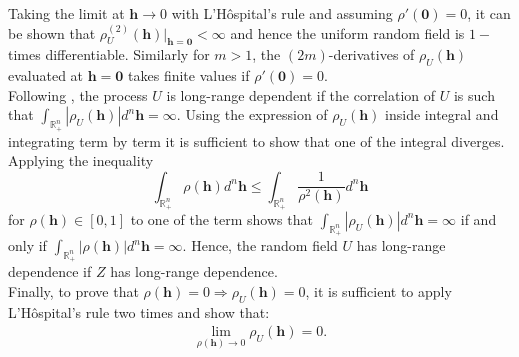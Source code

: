 \documentclass[times,sort&compress,3p]{elsarticle}
\theoremstyle{plain}%
\theoremstyle{definition}
\def\hh{\bm{h}}
\begin{document}
Taking the limit at $\hh\rightarrow 0$ with  L'H\^{o}spital's rule   and assuming $\rho'(\bm{0})=0$, it can be shown that $\rho_{U}^{(2)}(\hh)\big\vert_{\hh\bm{=0}}<\infty$ and hence the uniform random field is $1-$times differentiable. Similarly for  $m> 1$,  the $(2m)$-derivatives of $\rho_{U}(\hh)$  evaluated at $\hh=\bm{0}$
 takes finite values if $\rho'(\bm{0})=0$.
\\
Following \cite{LiTe09}, the process $U$ is long-range dependent if the correlation of $U$ is such that $\int_{\mathbb{R}_{+}^{n}}|\rho_{U}(\hh)|d^{n}\hh=\infty$.
Using the expression of $\rho_{U}(\hh)$ inside integral and integrating term by term it is sufficient to show that one of the integral diverges.
Applying the inequality  $$\int_{\mathbb{R}_{+}^{n}}\rho(\hh)d^{n}\hh \leq  \int_{\mathbb{R}_{+}^{n}}\frac{1}{\rho^2(\hh)}d^{n}\hh$$ for $\rho(\hh)\in [0,1]$ to one of the term shows that $\int_{\mathbb{R}_{+}^{n}}|\rho_{U}(\hh)|d^{n}\hh=\infty$ if and only if $\int_{\mathbb{R}_{+}^{n}}|\rho(\hh)|d^{n}\hh=\infty$. Hence, the random field $U$ has long-range dependence  if $Z$ has long-range dependence.
\\

Finally, to prove that $\rho(\hh)=0 \Rightarrow \rho_{U}(\hh)=0$, it is sufficient to apply L'H\^{o}spital's rule two times and show that:
\begin{eqnarray*}
\lim_{\rho(\hh)\rightarrow 0} \rho_{U}(\hh)=0.
\end{eqnarray*}








%
\end{document}
